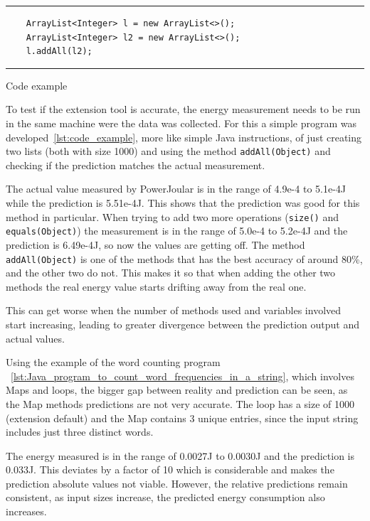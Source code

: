 \begin{listing}[H]
\noindent\rule{\linewidth}{0.4pt}
\begin{verbatim}
    ArrayList<Integer> l = new ArrayList<>();
    ArrayList<Integer> l2 = new ArrayList<>();
    l.addAll(l2);
\end{verbatim}
\noindent\rule{\linewidth}{0.4pt}
\caption{Code example}            
\label{lst:code_example}
\end{listing}

To test if the extension tool is accurate, the energy measurement needs to be run in the same machine were the data was collected.
For this a simple program was developed~\ref{lst:code_example}, more like simple Java instructions, of just creating two lists (both with size 1000) and using the method \texttt{addAll(Object)} and checking if the prediction matches the actual measurement.

The actual value measured by PowerJoular is in the range of 4.9e-4 to 5.1e-4J while the prediction is 5.51e-4J. This shows that the prediction was good for this method in particular.
When trying to add two more operations (\texttt{size()} and \texttt{equals(Object)}) the measurement is in the range of 5.0e-4 to 5.2e-4J and the prediction is 6.49e-4J, so now the values are getting off. The method \texttt{addAll(Object)} is one of the methods that has the best accuracy of around 80\%, and the other two do not. This makes it so that when adding the other two methods the real energy value starts drifting away from the real one.

This can get worse when the number of methods used and variables involved start increasing, leading to greater divergence between the prediction output and actual values. 

Using the example of the word counting program ~\ref{lst:Java_program_to_count_word_frequencies_in_a_string}, which involves Maps and loops, the bigger gap between reality and prediction can be seen, as the Map methods predictions are not very accurate. The loop has a size of 1000 (extension default) and the Map contains 3 unique entries, since the input string includes just three distinct words.

The energy measured is in the range of 0.0027J to 0.0030J and the prediction is 0.033J. This deviates by a factor of 10 which is considerable and makes the prediction absolute values not viable. However, the relative predictions remain consistent, as input sizes increase, the predicted energy consumption also increases.


